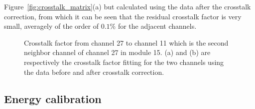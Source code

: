 \documentclass[preprint,sort&compress,12pt]{elsarticle}
\begin{document}
Figure~\ref{fig:crosstalk_matrix}(a) but calculated using the data after the crosstalk correction, from which it can be seen that the residual crosstalk factor is very small, averagely of the order of $0.1\%$ for the adjacent channels.

\begin{figure}[!ht]
\hspace{2mm}
\caption{Crosstalk factor from channel 27 to channel 11 which is the second neighbor channel of channel 27 in module 15. (a) and (b) are respectively the crosstalk factor fitting for the two channels using the data before and after crosstalk correction.}\label{fig:xtalk_second_neighbor}
\end{figure}

\newpage

\subsection{Energy calibration}\label{sec:energy_calibration}
\end{document}
